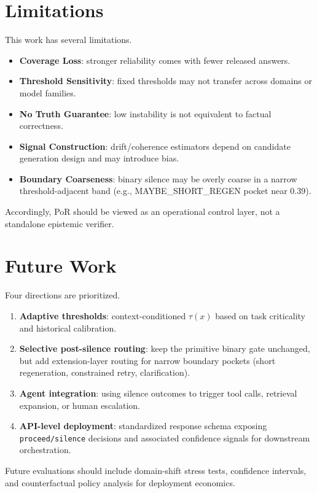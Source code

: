 \documentclass[11pt]{article}
\begin{document}
\section{Limitations}
This work has several limitations.
\begin{itemize}[leftmargin=1.5em]
    \item \textbf{Coverage Loss}: stronger reliability comes with fewer released answers.
    \item \textbf{Threshold Sensitivity}: fixed thresholds may not transfer across domains or model families.
    \item \textbf{No Truth Guarantee}: low instability is not equivalent to factual correctness.
    \item \textbf{Signal Construction}: drift/coherence estimators depend on candidate generation design and may introduce bias.
    \item \textbf{Boundary Coarseness}: binary silence may be overly coarse in a narrow threshold-adjacent band (e.g., MAYBE\_SHORT\_REGEN pocket near 0.39).
\end{itemize}

Accordingly, PoR should be viewed as an operational control layer, not a standalone epistemic verifier.

\section{Future Work}
Four directions are prioritized.
\begin{enumerate}[leftmargin=1.5em]
    \item \textbf{Adaptive thresholds}: context-conditioned $\tau(x)$ based on task criticality and historical calibration.
    \item \textbf{Selective post-silence routing}: keep the primitive binary gate unchanged, but add extension-layer routing for narrow boundary pockets (short regeneration, constrained retry, clarification).
    \item \textbf{Agent integration}: using silence outcomes to trigger tool calls, retrieval expansion, or human escalation.
    \item \textbf{API-level deployment}: standardized response schema exposing \texttt{proceed/silence} decisions and associated confidence signals for downstream orchestration.
\end{enumerate}

Future evaluations should include domain-shift stress tests, confidence intervals, and counterfactual policy analysis for deployment economics.
\end{document}
